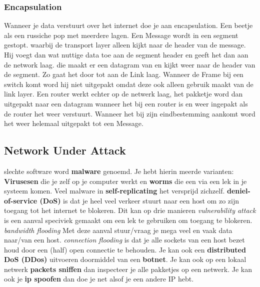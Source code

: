\subsubsection{Encapsulation}
Wanneer je data verstuurt over het internet doe je aan encapsulation. Een beetje als een russiche pop met meerdere lagen. Een Message wordt in een segment gestopt. waarbij de transport layer alleen kijkt naar de header van de message. Hij voegt dan wat nuttige data toe aan de segment header en geeft het dan aan de network laag. die maakt er een datagram van en kijkt weer naar de header van de segment. Zo gaat het door tot aan de Link laag. Wanneer de Frame bij een switch komt word hij niet uitgepakt omdat deze ook alleen gebruik maakt van de link layer. Een router werkt echter op de netwerk laag, het pakketje word dan uitgepakt naar een datagram wanneer het bij een router is en weer ingepakt als de router het weer verstuurt. Wanneer het bij zijn eindbestemming aankomt word het weer helemaal uitgepakt tot een Message.
\subsection{Network Under Attack}
slechte software word \textbf{malware} genoemd. Je hebt hierin meerde varianten: \textbf{Virusesen} die je zelf op je computer werkt en \textbf{worms} die een via een lek in je systeem komen. Veel malware in \textbf{self-replicating} het versprijd zichzelf.
\newline
\textbf{deniel-of-service (DoS)} is dat je heel veel verkeer stuurt naar een host om zo zijn toegang tot het internet te blokeren. Dit kan op drie manieren \textit{vulnerability attack} is een aanval speciviek gemaakt om een lek te gebruiken om toegang te blokeren. \textit{bandwidth flooding} Met deze aanval stuur/vraag je mega veel en vaak data naar/van een host. \textit{connection flooding} is dat je alle sockets van een host bezet houd door een (half) open connectie te behouden. Je kan ook een \textbf{distributed DoS (DDos)} uitvoeren doormiddel van een \textbf{botnet}.
\newline
Je kan ook op een lokaal netwerk \textbf{packets sniffen} dan inspecteer je alle pakketjes op een netwerk. Je kan ook je \textbf{ip spoofen} dan doe je net alsof je een andere IP hebt.